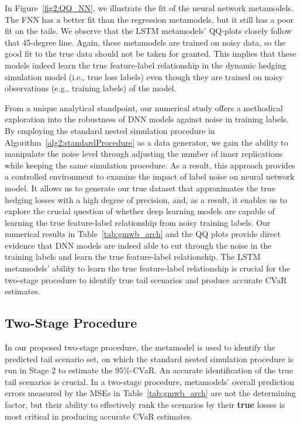 In Figure~\ref{fig2:QQ_NN}, we illustrate the fit of the neural network metamodels.
The FNN has a better fit than the regression metamodels, but it still has a poor fit on the tails.
We observe that the LSTM metamodels' QQ-plots closely follow that 45-degree line.
Again, these metamodels are trained on noisy data, so the good fit to the true data should not be taken for granted.
This implies that these models indeed learn the true feature-label relationship in the dynamic hedging simulation model (i.e., true loss labels) even though they are trained on noisy observations (e.g., training labels) of the model.

From a unique analytical standpoint, our numerical study offers a methodical exploration into the robustness of DNN models against noise in training labels. 
By employing the standard nested simulation procedure in Algorithm~\ref{alg2:standardProcedure} as a data generator, we gain the ability to manipulate the noise level through adjusting the number of inner replications while keeping the same simulation procedure.
As a result, this approach provides a controlled environment to examine the impact of label noise on neural network model.
It allows us to generate our true dataset that approximates the true hedging losses with a high degree of precision, and, as a result, it enables us to explore the crucial question of whether deep learning models are capable of learning the true feature-label relationship from noisy training labels.
Our numerical results in Table~\ref{tab:gmwb_arch} and the QQ plots provide direct evidence that DNN models are indeed able to cut through the noise in the training labels and learn the true feature-label relationship.
The LSTM metamodels' ability to learn the true feature-label relationship is crucial for the two-stage procedure to identify true tail scenarios and produce accurate CVaR estimates.

\subsection{Two-Stage Procedure} \label{subsec:twoStageProcedure}

In our proposed two-stage procedure, the metamodel is used to identify the predicted tail scenario set, on which the standard nested simulation procedure is run in Stage 2 to estimate the $95\%$-CVaR.
An accurate identification of the true tail scenarios is crucial.
In a two-stage procedure, metamodels' overall prediction errors measured by the MSEs in Table~\ref{tab:gmwb_arch} are not the determining factor, but their ability to effectively rank the scenarios by their \textbf{true} losses is most critical in producing accurate CVaR estimates.

